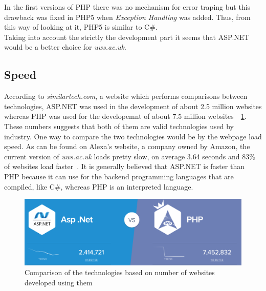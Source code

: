 \documentclass[11]{article}
\begin{document}
	\indent
	In the first versions of PHP there was no mechanism for error traping but this drawback was fixed in PHP5 when \textit{Exception Handling} was added. Thus, from this way of looking at it, PHP5 is similar to C\#.\\
	
	\indent
	Taking into account the strictly the development part it seems that ASP.NET would be a better choice for \textit{uws.ac.uk}.  


	\subsection{Speed}
   According to \textit{similartech.com}, a website which performs comparisons between technologies, ASP.NET was used in the development of about 2.5 million websites whereas PHP was used for the developemnt of about 7.5 million websites~\citep{CompPhpAsp}~\ref{websites}. These numbers suggests that both of them are valid technologies used by industry. One way to compare the two technologies would be by the webpage load speed. As can be found on Alexa's website, a company owned by Amazon, the current version of \textit{uws.ac.uk} loads pretty slow, on average 3.64 seconds and 83\% of websites load faster~\citep{LoadSpeed}.
It is generally believed that  ASP.NET is faster than PHP because it can use for the backend programming languages that are compiled, like C\#, whereas PHP is an interpreted language. \\

	\begin{figure}[H]

			\begin{center}
					\includegraphics[scale = 0.3]{websites.png}
			\end{center}
			\caption{Comparison of the technologies based on number of websites developed using them}
			\label{websites}
	\end{figure}
\end{document}

